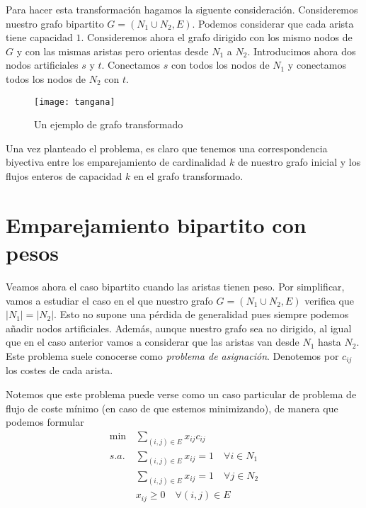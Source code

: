 \documentclass[twoside,12pt]{article}
\begin{document}
Para hacer esta transformación hagamos la siguente consideración. Consideremos nuestro grafo bipartito $G=(N_1\cup N_2,E)$. Podemos considerar que cada arista tiene capacidad $1$. Consideremos ahora el grafo dirigido con los mismo nodos de $G$ y con las mismas aristas pero orientas desde $N_1$ a $N_2$. Introducimos ahora dos nodos artificiales $s$ y $t$. Conectamos $s$ con todos los nodos de $N_1$ y conectamos todos los nodos de $N_2$ con $t$.  

\begin{figure}[h!]
\centering
\texttt{[image: tangana]}
\caption{Un ejemplo de grafo transformado}
\end{figure}
Una vez planteado el problema, es claro que tenemos una correspondencia biyectiva entre los emparejamiento de cardinalidad $k$ de nuestro grafo inicial y los flujos enteros de capacidad $k$ en el grafo transformado.
\section{Emparejamiento bipartito con pesos}
Veamos ahora el caso bipartito cuando las aristas tienen peso. Por simplificar, vamos a estudiar el caso en el que nuestro grafo $G=(N_1\cup N_2,E)$ verifica que $|N_1| = |N_2|$. Esto no supone una pérdida de generalidad pues siempre podemos añadir nodos artificiales. Además, aunque nuestro grafo sea no dirigido, al igual que en el caso anterior vamos a considerar que las aristas van desde $N_1$ hasta $N_2$. Este problema suele conocerse como \textit{problema de asignación}. Denotemos por $c_{ij}$ los costes de cada arista.

Notemos que este problema puede verse como un caso particular de problema de flujo de coste mínimo (en caso de que estemos minimizando), de manera que podemos formular
\begin{align*}
\min &\sum_{(i,j)\in E} x_{ij}c_{ij}\\
s.a.\;& \sum_{(i,j)\in E} x_{ij} = 1 \quad \forall i \in N_1\\
&\sum_{(i,j) \in E} x_{ij} = 1 \quad \forall j \in N_2\\
&x_{ij} \geq0 \quad \forall (i,j)\in E
\end{align*}
\end{document}
